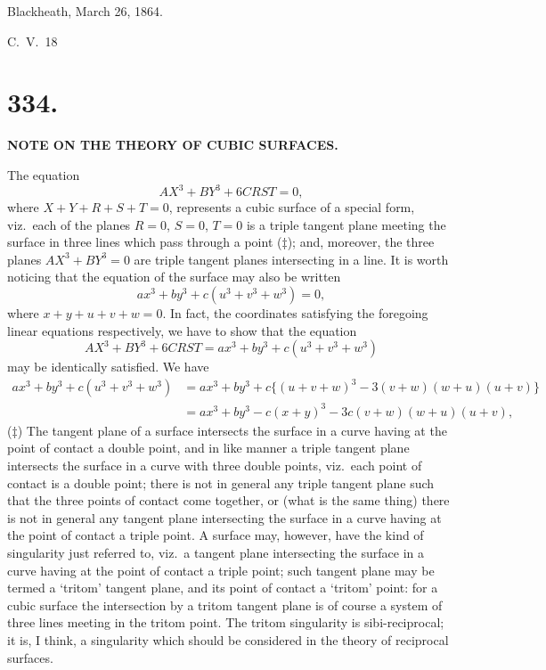 \documentclass[11pt,a4paper]{article}
\begin{document}
\begin{flushright}
Blackheath, March 26, 1864.
\end{flushright}
\noindent C.\ V.\ 18

\newpage
\section*{334.}

\begin{center}
\textbf{NOTE ON THE THEORY OF CUBIC SURFACES.}
\end{center}


\bigskip

\noindent The equation
\[
AX^3 + BY^3 + 6CRST = 0,
\]
where $X+Y+R+S+T=0$, represents a cubic surface of a special form, viz.\ each of the planes $R=0$, $S=0$, $T=0$ is a triple tangent plane meeting the surface in three lines which pass through a point ($\ddag$); and, moreover, the three planes $AX^3 + BY^3 = 0$ are triple tangent planes intersecting in a line. It is worth noticing that the equation of the surface may also be written
\[
ax^3 + by^3 + c(u^3 + v^3 + w^3) = 0,
\]
where $x+y+u+v+w=0$. In fact, the coordinates satisfying the foregoing linear equations respectively, we have to show that the equation
\[
AX^3 + BY^3 + 6CRST = ax^3 + by^3 + c(u^3+v^3+w^3)
\]
may be identically satisfied. We have
\begin{align*}
ax^3 + by^3 + c(u^3+v^3+w^3) &= ax^3 + by^3 + c\{(u+v+w)^3 - 3(v+w)(w+u)(u+v)\} \\
&= ax^3 + by^3 - c(x+y)^3 - 3c(v+w)(w+u)(u+v),
\end{align*}
($\ddag$) The tangent plane of a surface intersects the surface in a curve having at the point of contact a double point, and in like manner a triple tangent plane intersects the surface in a curve with three double points, viz.\ each point of contact is a double point; there is not in general any triple tangent plane such that the three points of contact come together, or (what is the same thing) there is not in general any tangent plane intersecting the surface in a curve having at the point of contact a triple point. A surface may, however, have the kind of singularity just referred to, viz.\ a tangent plane intersecting the surface in a curve having at the point of contact a triple point; such tangent plane may be termed a `tritom' tangent plane, and its point of contact a `tritom' point: for a cubic surface the intersection by a tritom tangent plane is of course a system of three lines meeting in the tritom point. The tritom singularity is sibi-reciprocal; it is, I think, a singularity which should be considered in the theory of reciprocal surfaces.
\end{document}
